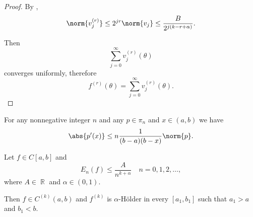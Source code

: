 \begin{proof}
  By ,
  \begin{equation*}
    \norm{v_j^{(r)}} \leq 2^{jr} \norm{v_j} \leq \frac B {2^{j(k - r + \alpha)}}.
  \end{equation*}

  Then
  \begin{equation*}
    \sum_{j=0}^\infty v_j^{(r)} (\theta)
  \end{equation*}
  converges uniformly, therefore
  \begin{equation*}
    f^{(r)}(\theta) = \sum_{j=0}^\infty v_j^{(r)} (\theta).
  \end{equation*}
\end{proof}

\begin{theorem}\label{thm:bernsteins_algebraic_inequality}\mcite\cite[59]{Николов2020}
  For any nonnegative integer \( n \) and any \( p \in \pi_n \) and \( x \in (a, b) \) we have
  \begin{equation*}
    \abs{p'(x)} \leq n \frac 1 {(b - a)(b - x)} \norm{p}.
  \end{equation*}
\end{theorem}

\begin{theorem}\label{thm:bernsteins_algebraic_theorem}\mcite\cite[60]{Николов2020}
  Let \( f \in C[a, b] \) and
  \begin{equation*}
    E_n(f) \leq \frac A {n^{k+\alpha}} \quad n = 0, 1, 2, \ldots,
  \end{equation*}
  where \( A \in \BbbR \) and \( \alpha \in (0, 1) \).

  Then \( f \in C^{(k)}(a, b) \) and \( f^{(k)} \) is \( \alpha \)-H\"older in every \( [a_1, b_1] \) such that \( a_1 > a \) and \( b_1 < b \).
\end{theorem}
